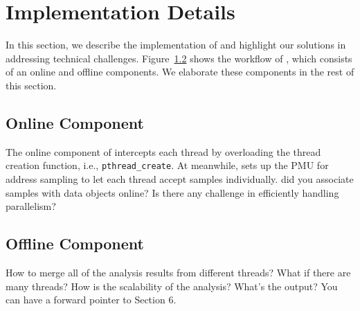 \section{Implementation Details}
\label{sec:implement}

In this section, we describe the implementation of \cheetah{} and highlight our solutions in addressing technical challenges. Figure~\ref{} shows the workflow of \cheetah{}, 
which consists of an online and offline components. We elaborate these components in the rest of this section.

\subsection{Online Component}
The online component of \cheetah{} intercepts each thread by overloading the thread creation function, i.e., {\tt pthread\_create}. At meanwhile, \cheetah{} sets up the PMU for address sampling to let each thread accept samples individually. {\color{red} did you associate samples with data objects online? Is there any challenge in efficiently handling parallelism?}



\subsection{Offline Component}
{\color{red} How to merge all of the analysis results from different threads? What if there are many threads? How is the scalability of the analysis? What's the output? You can have a forward pointer to Section 6.}


